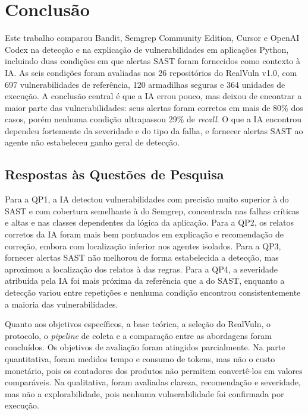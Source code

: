 \chapter{Conclusão}\label{cap:conclusao}

Este trabalho comparou Bandit, Semgrep Community Edition, Cursor e OpenAI Codex
na detecção e na explicação de vulnerabilidades em aplicações Python, incluindo
duas condições em que alertas SAST foram fornecidos como contexto à IA. As seis
condições foram avaliadas nos 26 repositórios do RealVuln v1.0, com 697
vulnerabilidades de referência, 120 armadilhas seguras e 364 unidades de
execução. A conclusão central é que a IA errou pouco, mas deixou de encontrar
a maior parte das vulnerabilidades: seus alertas foram corretos em mais de 80\%
dos casos, porém nenhuma condição ultrapassou 29\% de \textit{recall}. O que a
IA encontrou dependeu fortemente da severidade e do tipo da falha, e fornecer
alertas SAST ao agente não estabeleceu ganho geral de detecção.

\section{Respostas às Questões de Pesquisa}\label{sec:respostas-qp}

Para a QP1, a IA detectou vulnerabilidades com precisão muito superior à do SAST
e com cobertura semelhante à do Semgrep, concentrada nas falhas críticas e
altas e nas classes dependentes da lógica da aplicação. Para a QP2, os relatos
corretos da IA foram mais bem pontuados em explicação e recomendação de
correção, embora com localização inferior nos agentes isolados. Para a QP3,
fornecer alertas SAST não melhorou de forma estabelecida a detecção, mas
aproximou a localização dos relatos à das regras. Para a QP4, a severidade
atribuída pela IA foi mais próxima da referência que a do SAST, enquanto a
detecção variou entre repetições e nenhuma condição encontrou consistentemente
a maioria das vulnerabilidades.

Quanto aos objetivos específicos, a base teórica, a seleção do RealVuln, o
protocolo, o \textit{pipeline} de coleta e a comparação entre as abordagens
foram concluídos. Os objetivos de avaliação foram atingidos parcialmente.
Na parte quantitativa, foram medidos tempo e consumo de tokens, mas não o custo
monetário, pois os contadores dos produtos não permitem convertê-los em valores
comparáveis. Na qualitativa, foram avaliadas clareza, recomendação e
severidade, mas não a explorabilidade, pois nenhuma vulnerabilidade foi
confirmada por execução.


